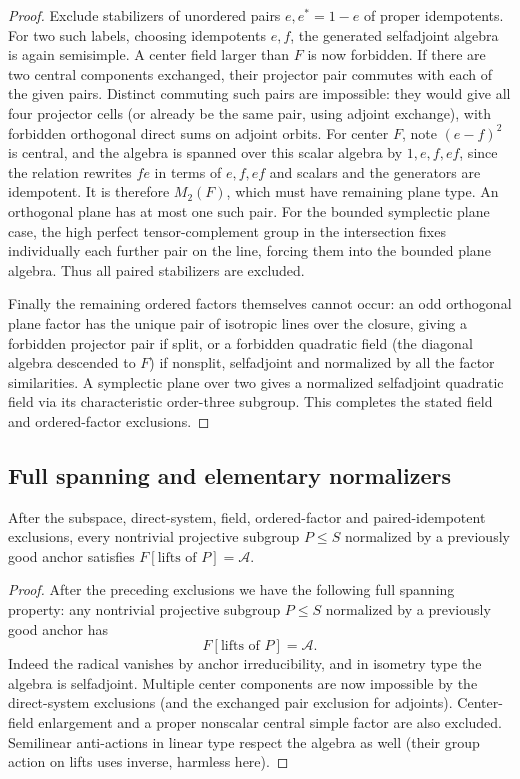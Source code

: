\begin{proof}
Exclude stabilizers of unordered pairs \(e,e^*=1-e\) of proper idempotents. For two such labels, choosing idempotents \(e,f\), the generated selfadjoint algebra is again semisimple. A center field larger than \(F\) is now forbidden. If there are two central components exchanged, their projector pair commutes with each of the given pairs. Distinct commuting such pairs are impossible: they would give all four projector cells (or already be the same pair, using adjoint exchange), with forbidden orthogonal direct sums on adjoint orbits. For center \(F\), note \((e-f)^2\) is central, and the algebra is spanned over this scalar algebra by \(1,e,f,ef\), since the relation rewrites \(fe\) in terms of \(e,f,ef\) and scalars and the generators are idempotent. It is therefore \(M_2(F)\), which must have remaining plane type. An orthogonal plane has at most one such pair. For the bounded symplectic plane case, the high perfect tensor-complement group in the intersection fixes individually each further pair on the line, forcing them into the bounded plane algebra. Thus all paired stabilizers are excluded.

Finally the remaining ordered factors themselves cannot occur: an odd orthogonal plane factor has the unique pair of isotropic lines over the closure, giving a forbidden projector pair if split, or a forbidden quadratic field (the diagonal algebra descended to \(F\)) if nonsplit, selfadjoint and normalized by all the factor similarities. A symplectic plane over two gives a normalized selfadjoint quadratic field via its characteristic order-three subgroup. This completes the stated field and ordered-factor exclusions.
\end{proof}

\subsection{Full spanning and elementary normalizers}

\begin{lemma}\label{c:full-spanning}
After the subspace, direct-system, field, ordered-factor and paired-idempotent exclusions, every nontrivial projective subgroup \(P\le S\) normalized by a previously good anchor satisfies \(F[\text{lifts of }P]=\mathcal A\).
\end{lemma}

\begin{proof}
After the preceding exclusions we have the following full spanning property: any nontrivial projective subgroup \(P\le S\) normalized by a previously good anchor has
\[
 F[\text{lifts of }P]=\mathcal A .
\]
Indeed the radical vanishes by anchor irreducibility, and in isometry type the algebra is selfadjoint. Multiple center components are now impossible by the direct-system exclusions (and the exchanged pair exclusion for adjoints). Center-field enlargement and a proper nonscalar central simple factor are also excluded. Semilinear anti-actions in linear type respect the algebra as well (their group action on lifts uses inverse, harmless here).
\end{proof}

